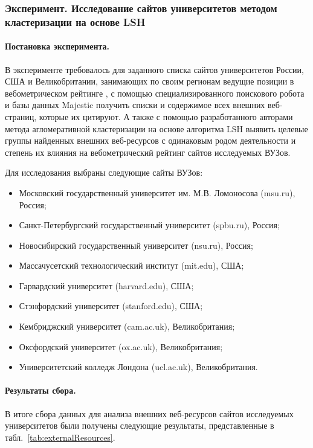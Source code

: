 \subsubsection{Эксперимент. Исследование сайтов университетов методом кластеризации на основе LSH}
\paragraph{Постановка эксперимента.} В эксперименте требовалось для заданного списка сайтов университетов России, США и Великобритании, занимающих по своим регионам ведущие позиции в вебометрическом рейтинге \cite{RankingWeb}, с помощью специализированного поискового робота \cite{BlekanovSergeevMartynenko} и базы данных Majestic \cite{Majestic} получить списки и содержимое всех внешних веб-страниц, которые их цитируют. А также с помощью разработанного авторами метода агломеративной кластеризации на основе алгоритма LSH выявить целевые группы найденных внешних веб-ресурсов с одинаковым родом деятельности и степень их влияния на вебометрический рейтинг сайтов исследуемых ВУЗов.

Для исследования выбраны следующие сайты ВУЗов:
\begin{itemize}
	\item Московский государственный университет им. М.В. Ломоносова (msu.ru), Россия;
	\item Санкт-Петербургский государственный университет (spbu.ru), Россия;
	\item Новосибирский государственный университет (nsu.ru), Россия;
	\item Массачусетский технологический институт (mit.edu), США;
	\item Гарвардский университет (harvard.edu), США;
	\item Стэнфордский университет (stanford.edu), США;
	\item Кембриджский университет (cam.ac.uk), Великобритания;
	\item Оксфордский университет (ox.ac.uk), Великобритания;
	\item Университетский колледж Лондона (ucl.ac.uk), Великобритания.
\end{itemize}

\paragraph{Результаты сбора.} В итоге сбора данных для анализа внешних веб-ресурсов сайтов исследуемых университетов были получены следующие результаты, представленные в табл.~\cref{tab:externalResources}.

